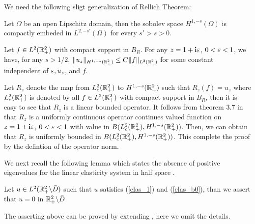 \documentclass[12pt]{iopart}
\begin{document}
We need the following sligt generalization of Rellich Theorem:
\begin{lem}\label{relli_embed}
	Let $\Omega$ be an open Lipschitz domain, then the sobolev space $H^{1,-s}(\Omega)$ is compactly embeded in $L^{2,-s'}(\Omega)$ for every $s'>s>0$.
\end{lem}

\begin{lem}{\label{global_es}}
	Let  $ f  \in L^2 ({\mathbb{R}}^2_+) $ with compact support in $B_R$. For any $z=1+\mathbf{i}\varepsilon$, $0<\varepsilon<1$, we have, for any $s>1/2$,
	$\|u_z\|_{H^{1,-s}({\mathbb{R}}^2_+)}\le C\|f\|_{L^2({\mathbb{R}}^2_+)}$ for some constant independent of $\varepsilon, u_z$, and $f$.
\end{lem}
\debproof
Let $R_z$ denote the map from $L^2_c({\mathbb{R}}^2_+)$ to $H^{1,-s}({\mathbb{R}}^2_+)$ such that $R_z(f)=u_z$ where $L^2_c({\mathbb{R}}^2_+)$ is denoted by all $ f  \in L^2 ({\mathbb{R}}^2_+) $ with compact support in $B_R$, then it is easy to see that $R_z$ is a linear bounded operator. It follows from theorem 3.7 in \cite{Yves1988} that $R_z$ is a uniformly continuous operator continues valued function on $z=1+\mathbf{i}\varepsilon$, $0<\varepsilon<1$ with value in $B(L^2_c({\mathbb{R}}^2_+),H^{1,-s}({\mathbb{R}}^2_+))$. Then, we can obtain that $R_z$ is uniformly bounded in $B(L^2_c({\mathbb{R}}^2_+),H^{1,-s}({\mathbb{R}}^2_+))$. This complete the proof by the defintion of the operator norm.
\finproof

We next recall the following lemma which states the absence of positive eigenvalues for the linear elasticity system in half space \cite{sini2004}.
\begin{lem} \label{elas_unique}
	Let $u\in L^2({\mathbb{R}}^2_+ \backslash \bar D)$ such that $u$ satisfies (\ref{elas_1}) and (\ref{elas_b0}), than we assert that $u=0$ in ${\mathbb{R}}^2_+ \backslash \bar D$
\end{lem}
\debproof
The asserting above can be proved by extending \cite[theorem 3.1]{sini2004}, here we omit the details.
\finproof
\end{document}
